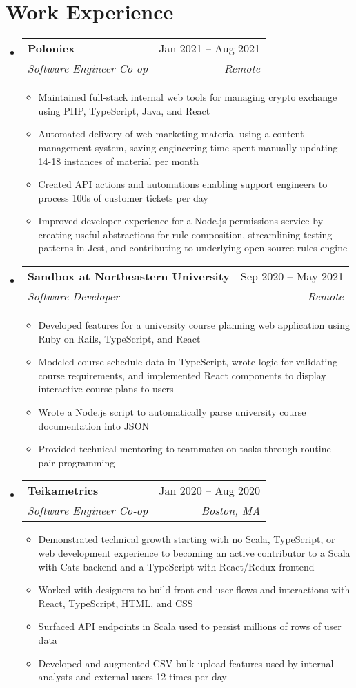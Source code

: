 \documentclass[letterpaper, 11pt]{article}
\makeatletter
\newcommand{\resumeItem}[1]{
  \item\small{
    {#1 \vspace{-2pt}}
  }
}
\newcommand{\resumeSubheading}[4]{
  \vspace{-2pt}\item
    \begin{tabular*}{0.97\textwidth}[t]{l@{\extracolsep{\fill}}r}
      \textbf{#1} & #2 \\
     \textit{\small#3} & \textit{\small#4} \\
    \end{tabular*}\vspace{-7pt}
}
\newcommand{\resumeSubHeadingListStart}{\begin{itemize}[leftmargin=0.15in, label={}]}
\newcommand{\resumeSubHeadingListEnd}{\end{itemize}}
\newcommand{\resumeItemListStart}{\begin{itemize}}
\newcommand{\resumeItemListEnd}{\end{itemize}\vspace{-5pt}}
\makeatother
\begin{document}
\section{Work Experience}
    \resumeSubHeadingListStart    
        \resumeSubheading
            {Poloniex}{Jan 2021 -- Aug 2021}{Software Engineer Co-op}{Remote}
            \resumeItemListStart
                \resumeItem{Maintained full-stack internal web tools for managing crypto exchange using PHP, TypeScript, Java, and React}
                \resumeItem{Automated delivery of web marketing material using a content management system, saving engineering time spent manually updating 14-18 instances of material per month}
                \resumeItem{Created API actions and automations enabling support engineers to process 100s of customer tickets per day}
                \resumeItem{Improved developer experience for a Node.js permissions service by creating useful abstractions for rule composition, streamlining testing patterns in Jest, and contributing to underlying open source rules engine}
            \resumeItemListEnd
        \resumeSubheading
            {Sandbox at Northeastern University}{Sep 2020 -- May 2021}{Software Developer}{Remote}
            \resumeItemListStart
                \resumeItem{Developed features for a university course planning web application using Ruby on Rails, TypeScript, and React}
                \resumeItem{Modeled course schedule data in TypeScript, wrote logic for validating course requirements, and implemented React components to display interactive course plans to users}
                \resumeItem{Wrote a Node.js script to automatically parse university course documentation into JSON}
                \resumeItem{Provided technical mentoring to teammates on tasks through routine pair-programming}
            \resumeItemListEnd
        \resumeSubheading
            {Teikametrics}{Jan 2020 -- Aug 2020}{Software Engineer Co-op}{Boston, MA}
            \resumeItemListStart
                \resumeItem{Demonstrated technical growth starting with no Scala, TypeScript, or web development experience to becoming an active contributor to a Scala with Cats backend and a TypeScript with React/Redux frontend}
                \resumeItem{Worked with designers to build front-end user flows and interactions with React, TypeScript, HTML, and CSS}
                \resumeItem{Surfaced API endpoints in Scala used to persist millions of rows of user data}
                \resumeItem{Developed and augmented CSV bulk upload features used by internal analysts and external users 12 times per day}
            \resumeItemListEnd
    \resumeSubHeadingListEnd
  
\end{document}
